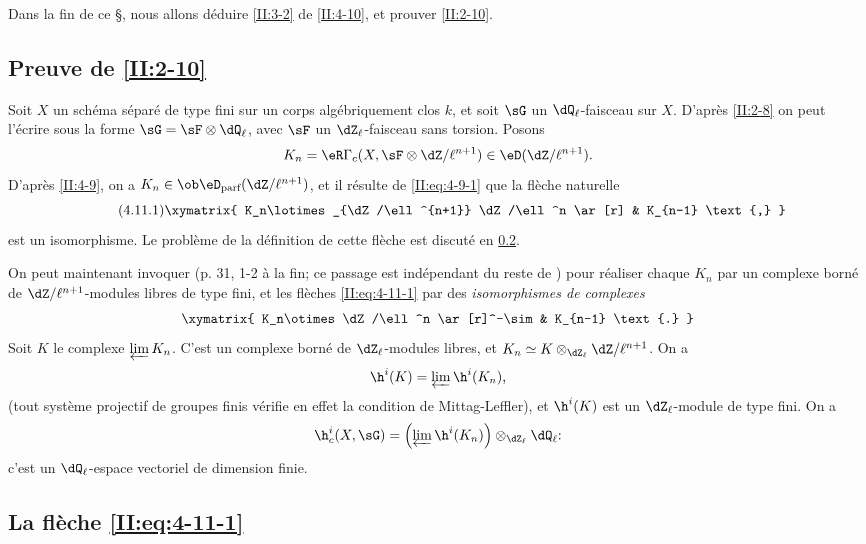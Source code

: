 Dans la fin de ce \S, nous allons déduire \ref{II:3-2} de \ref{II:4-10}, et 
prouver \ref{II:2-10}. 





\subsection{Preuve de \texorpdfstring{\ref{II:2-10}}{2.10}}\label{II:4-11}

Soit $X$ un schéma séparé de type fini sur un corps algébriquement clos 
$k$, et soit $\sG$ un $\dQ_\ell$-faisceau sur $X$. D'après \ref{II:2-8} on 
peut l'écrire sous la forme $\sG=\sF\otimes\dQ_\ell$, avec $\sF$ un 
$\dZ_\ell$-faisceau sans torsion. Posons 
\[
  K_n = \eR \Gamma_c(X,\sF\otimes\dZ/\ell^{n+1})\in\eD(\dZ/\ell^{n+1}) \text{.}
\]
D'après \ref{II:4-9}, on a $K_n\in\ob\eD_\text{parf}(\dZ/\ell^{n+1})$, et il 
résulte de \eqref{II:eq:4-9-1} que la flèche naturelle 
\begin{equation*}\tag{4.11.1}\label{II:eq:4-11-1}
\xymatrix{
  K_n\lotimes_{\dZ/\ell^{n+1}} \dZ/\ell^n \ar[r] & K_{n-1} \text{,}
}
\end{equation*}
est un isomorphisme. Le problème de la définition de cette flèche est 
discuté en \ref{II:4-12}. 

On peut maintenant invoquer \cite[XV.3.3]{sga5} (p. 31, 1-2 à la fin; ce 
passage est indépendant du reste de \cite{sga5}) pour réaliser chaque 
$K_n$ par un complexe borné de $\dZ/\ell^{n+1}$-modules libres de type fini, 
et les flèches \eqref{II:eq:4-11-1} par des \emph{isomorphismes de complexes} 
\[\xymatrix{
  K_n\otimes \dZ/\ell^n \ar[r]^-\sim 
    & K_{n-1} \text{.}
}\]
Soit $K$ le complexe $\varprojlim K_n$. C'est un complexe borné de 
$\dZ_\ell$-modules libres, et $K_n\simeq K\otimes_{\dZ_\ell}\dZ/\ell^{n+1}$. On 
a 
\[
  \h^i(K) = \varprojlim \h^i(K_n) \text{,}
\]
(tout système projectif de groupes finis vérifie en effet la condition de 
Mittag-Leffler), et $\h^i(K)$ est un $\dZ_\ell$-module de type fini. On a 
\[
  \h_c^i(X,\sG) = \left(\varprojlim \h^i(K_n) \right)\otimes_{\dZ_\ell} \dQ_\ell \text{:}
\]
c'est un $\dQ_\ell$-espace vectoriel de dimension finie. 





\subsection{La flèche \texorpdfstring{\eqref{II:eq:4-11-1}}{(4.11.1)}}\label{II:4-12}

